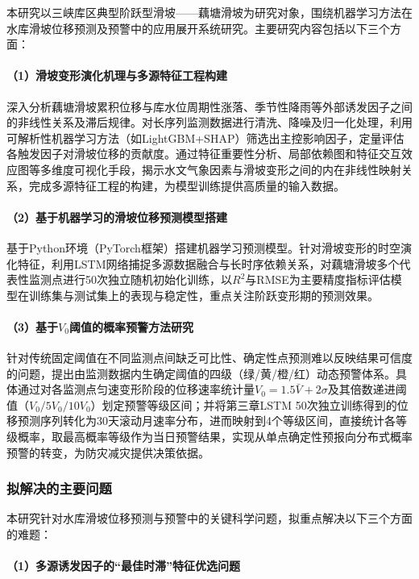\documentclass[12pt,a4paper]{article}
\begin{document}
本研究以三峡库区典型阶跃型滑坡——藕塘滑坡为研究对象，围绕机器学习方法在水库滑坡位移预测及预警中的应用展开系统研究。主要研究内容包括以下三个方面：

\paragraph{（1）滑坡变形演化机理与多源特征工程构建}

深入分析藕塘滑坡累积位移与库水位周期性涨落、季节性降雨等外部诱发因子之间的非线性关系及滞后规律。对长序列监测数据进行清洗、降噪及归一化处理，利用可解析性机器学习方法（如LightGBM+SHAP）筛选出主控影响因子，定量评估各触发因子对滑坡位移的贡献度。通过特征重要性分析、局部依赖图和特征交互效应图等多维度可视化手段，揭示水文气象因素与滑坡变形之间的内在非线性映射关系，完成多源特征工程的构建，为模型训练提供高质量的输入数据。

\paragraph{（2）基于机器学习的滑坡位移预测模型搭建}

基于Python环境（PyTorch框架）搭建机器学习预测模型。针对滑坡变形的时空演化特征，利用LSTM网络捕捉多源数据融合与长时序依赖关系，对藕塘滑坡多个代表性监测点进行50次独立随机初始化训练，以$R^2$与RMSE为主要精度指标评估模型在训练集与测试集上的表现与稳定性，重点关注阶跃变形期的预测效果。

\paragraph{（3）基于$V_0$阈值的概率预警方法研究}

针对传统固定阈值在不同监测点间缺乏可比性、确定性点预测难以反映结果可信度的问题，提出由监测数据内生确定阈值的四级（绿/黄/橙/红）动态预警体系。具体通过对各监测点匀速变形阶段的位移速率统计量$V_0 = 1.5\bar V + 2\sigma$及其倍数递进阈值（$V_0/5V_0/10V_0$）划定预警等级区间；并将第三章LSTM 50次独立训练得到的位移预测序列转化为30天滚动月速率分布，进而映射到4个等级区间，直接统计各等级概率，取最高概率等级作为当日预警结果，实现从单点确定性预报向分布式概率预警的转变，为防灾减灾提供决策依据。

\subsubsection{拟解决的主要问题}

本研究针对水库滑坡位移预测与预警中的关键科学问题，拟重点解决以下三个方面的难题：

\paragraph{（1）多源诱发因子的“最佳时滞”特征优选问题}
\end{document}
